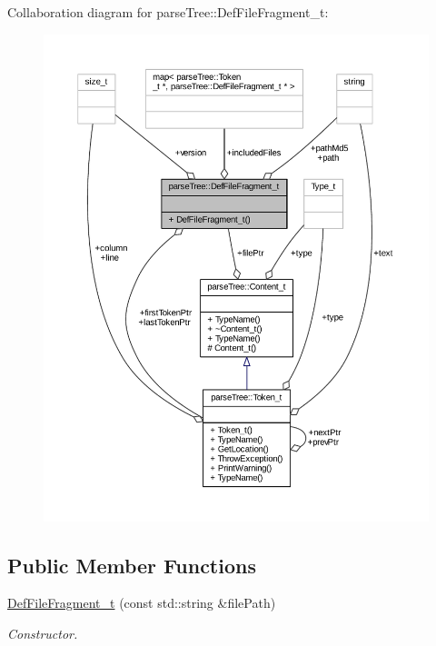 Collaboration diagram for parse\+Tree\+:\+:Def\+File\+Fragment\+\_\+t\+:
\nopagebreak
\begin{figure}[H]
\begin{center}
\leavevmode
\includegraphics[width=350pt]{structparse_tree_1_1_def_file_fragment__t__coll__graph}
\end{center}
\end{figure}
\subsection*{Public Member Functions}
\begin{DoxyCompactItemize}
\item 
\hyperlink{structparse_tree_1_1_def_file_fragment__t_a8dfbda00361e56e2cc8fcecd3c849869}{Def\+File\+Fragment\+\_\+t} (const std\+::string \&file\+Path)
\begin{DoxyCompactList}\small\item\em Constructor. \end{DoxyCompactList}\end{DoxyCompactItemize}
